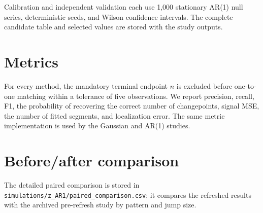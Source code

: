 \documentclass[11pt]{article}
\begin{document}
Calibration and independent validation each use 1,000 stationary AR(1) null
series, deterministic seeds, and Wilson confidence intervals. The complete
candidate table and selected values are stored with the study outputs.



\section*{Metrics}
For every method, the mandatory terminal endpoint $n$ is excluded before
one-to-one matching within a tolerance of five observations. We report
precision, recall, F1, the probability of recovering the correct number of
changepoints, signal MSE, the number of fitted segments, and localization
error. The same metric implementation is used by the Gaussian and AR(1)
studies.

\section*{Before/after comparison}
The detailed paired comparison is stored in
\texttt{simulations/z\_AR1/paired\_comparison.csv}; it compares the refreshed
results with the archived pre-refresh study by pattern and jump size.

{\scriptsize
\setlength{\tabcolsep}{2pt}

}
\end{document}
